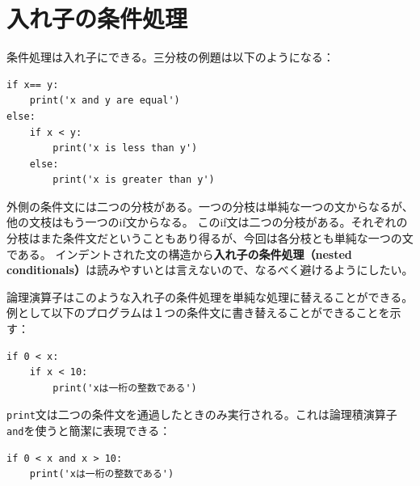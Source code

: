 \documentclass[a4j,12pt,makeidx]{jbook}
\begin{document}
\section{入れ子の条件処理}
条件処理は入れ子にできる。三分枝の例題は以下のようになる：
\begin{verbatim}
if x== y:
    print('x and y are equal')
else:
    if x < y:
        print('x is less than y')
    else:
        print('x is greater than y')
\end{verbatim}  
外側の条件文には二つの分枝がある。一つの分枝は単純な一つの文からなるが、他の文枝はもう一つのif文からなる。
このif文は二つの分枝がある。それぞれの分枝はまた条件文だということもあり得るが、今回は各分枝とも単純な一つの文である。
インデントされた文の構造から{\bf 入れ子の条件処理（nested conditionals）}は読みやすいとは言えないので、なるべく避けるようにしたい。\par
論理演算子はこのような入れ子の条件処理を単純な処理に替えることができる。
例として以下のプログラムは１つの条件文に書き替えることができることを示す：
\begin{verbatim}
if 0 < x:
    if x < 10:
        print('xは一桁の整数である')
\end{verbatim} 
{\tt print}文は二つの条件文を通過したときのみ実行される。これは論理積演算子{\tt and}を使うと簡潔に表現できる：
\begin{verbatim}
if 0 < x and x > 10:
    print('xは一桁の整数である')
\end{verbatim}
%
\end{document}
